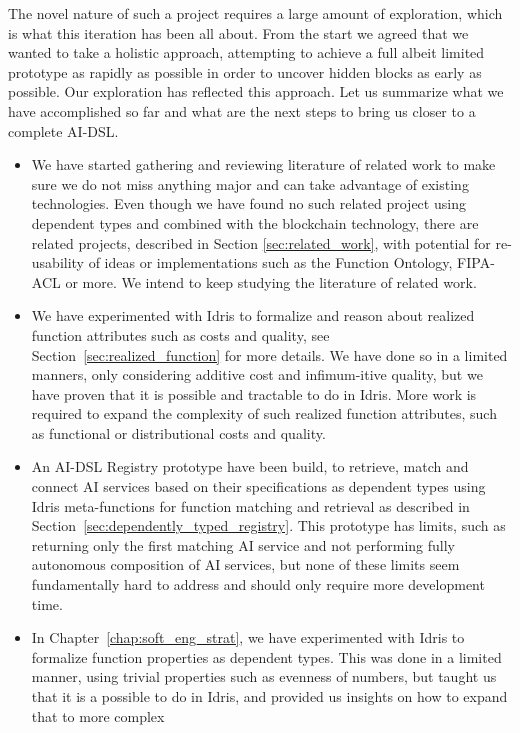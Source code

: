 \documentclass[]{report}
\begin{document}
The novel nature of such a project requires a large amount of
exploration, which is what this iteration has been all about.  From
the start we agreed that we wanted to take a holistic approach,
attempting to achieve a full albeit limited prototype as rapidly as
possible in order to uncover hidden blocks as early as possible.  Our
exploration has reflected this approach.  Let us summarize what we
have accomplished so far and what are the next steps to bring us
closer to a complete AI-DSL.
\begin{itemize}
\item We have started gathering and reviewing literature of related
  work to make sure we do not miss anything major and can take
  advantage of existing technologies.  Even though we have found no
  such related project using dependent types and combined with the
  blockchain technology, there are related projects, described in
  Section \ref{sec:related_work}, with potential for re-usability of
  ideas or implementations such as the Function Ontology, FIPA-ACL or
  more.  We intend to keep studying the literature of related work.
\item We have experimented with Idris to formalize and reason about
  realized function attributes such as costs and quality, see
  Section~\ref{sec:realized_function} for more details.  We have done
  so in a limited manners, only considering additive cost and
  infimum-itive quality, but we have proven that it is possible and
  tractable to do in Idris.  More work is required to expand the
  complexity of such realized function attributes, such as functional
  or distributional costs and quality.
\item An AI-DSL Registry prototype have been build, to retrieve, match
  and connect AI services based on their specifications as dependent
  types using Idris meta-functions for function matching and retrieval
  as described in Section~\ref{sec:dependently_typed_registry}.  This
  prototype has limits, such as returning only the first matching AI
  service and not performing fully autonomous composition of AI
  services, but none of these limits seem fundamentally hard to
  address and should only require more development time.
\item In Chapter~\ref{chap:soft_eng_strat}, we have experimented with
  Idris to formalize function properties as dependent types.  This was
  done in a limited manner, using trivial properties such as evenness
  of numbers, but taught us that it is a possible to do in Idris, and
  provided us insights on how to expand that to more complex

\end{itemize}
\end{document}
